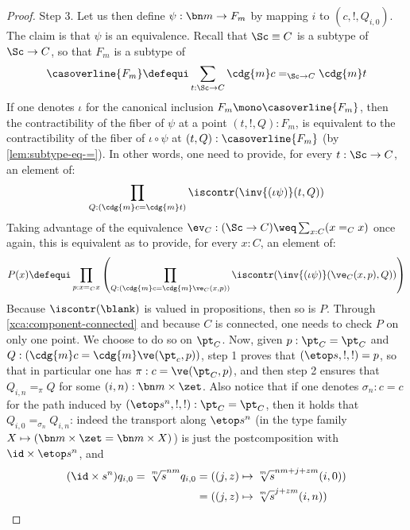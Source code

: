 \begin{proof}
  {\sc Step 3.} Let us then define $\psi: \bn m \to F_m$ by mapping
  $i$ to $(c,!,Q_{i,0})$. The claim is that $\psi$ is an
  equivalence. Recall that $\Sc \equiv C$ is a subtype of $\Sc \to C$,
  so that $F_m$ is a subtype of
  \begin{displaymath}
    \casoverline {F_m} \defequi \sum_{t:\Sc \to C}\cdg{m}c=_{\Sc\to C}\cdg{m}t
  \end{displaymath}
  If one denotes $\iota$ for the canonical inclusion
  $F_m\mono \casoverline{F_m}$, then the contractibility of the fiber of
  $\psi$ at a point $(t,!,Q):F_m$, is equivalent to the
  contractibility of the fiber of $\iota\circ\psi$ at
  $(t,Q):\casoverline{F_m}$ (by \cref{lem:subtype-eq-=}).  In other
  words, one need to provide, for every $t:\Sc \to C$, an element of:
  \begin{displaymath}
    \prod_{Q:(\cdg{m}c=\cdg{m}t)} \iscontr(\inv {(\iota \psi)} (t,Q))
  \end{displaymath}
  Taking advantage of the equivalence
  $\ev_C: (\Sc \to C) \weq \sum_{x:C}(x=_Cx)$ once again, this is
  equivalent as to provide, for every $x:C$, an element of:
  \begin{displaymath}
    P(x) \defequi \prod_{p:x=_Cx}
    \left(
      \prod_{Q:(\cdg{m}c=\cdg{m}\ve_C(x,p))} \iscontr(\inv {(\iota \psi)} (\ve_C(x,p),Q))
    \right)
  \end{displaymath}
  Because $\iscontr(\blank)$ is valued in propositions, then so is
  $P$. Through \cref{xca:component-connected} and because $C$ is
  connected, one needs to check $P$ on only one point. We choose to do
  so on $\pt_C$. Now, given $p:\pt_C = \pt_C$ and
  $Q:(\cdg{m}c=\cdg{m}\ve(\pt_c,p))$, step 1 proves that
  $(\etop s, !,!)=p$, so that in particular one has
  $\pi:c=\ve(\pt_C,p)$, and then step 2 ensures that $Q_{i,n}=_\pi Q$
  for some $(i,n):\bn m \times \zet$. Also notice that if one denotes
  $\sigma_n:c = c$ for the path induced by $(\etop s^n,!,!): \pt_C=\pt_C$,
  then it holds that $Q_{i,0}=_{\sigma_n}Q_{i,n}$: indeed the
  transport along $\etop s^n$ (in the type family
  $X \mapsto (\bn m\times \zet = \bn m\times X)$) is just the
  postcomposition with $\id \times \etop s^n$, and
  \begin{displaymath}
    \begin{split}
      (\id\times s^n) q_{i,0} = \sqrt[\uproot{2}m]s^{nm}q_{i,0} &= ((j,z)\mapsto \sqrt[\uproot{2}m]s^{nm+j+zm}(i,0))\\
      &= ((j,z)\mapsto \sqrt[\uproot{2}m]s^{j+zm}(i,n)) \\

\end{split}
\end{displaymath}
\end{proof}
